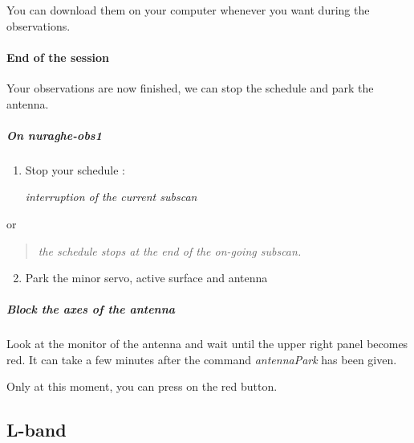\documentclass[letterpaper,10pt,english]{sphinxmanual}
\begin{document}
You can download them on your computer whenever you want during the observations.
\begin{quote}

\end{quote}


\paragraph{End of the session}
\label{SpectralLine/K-band/Xarcos/stop-session:end-of-the-session}\label{SpectralLine/K-band/Xarcos/stop-session::doc}
Your observations are now finished, we can stop the schedule and park
the antenna.


\subparagraph{On nuraghe-obs1}
\label{SpectralLine/K-band/Xarcos/stop-session:on-nuraghe-obs1}\begin{enumerate}
\item {} 
Stop your schedule :

   \emph{interruption of the current subscan}

\end{enumerate}

or
\begin{quote}

    \emph{the schedule stops at the end of the on-going subscan.}
\end{quote}
\begin{enumerate}
\setcounter{enumi}{1}
\item {} 
Park the minor servo, active surface and antenna





\end{enumerate}


\subparagraph{Block the axes of the antenna}
\label{SpectralLine/K-band/Xarcos/stop-session:block-the-axes-of-the-antenna}
Look at the monitor of the antenna and wait until the upper right
panel becomes red. It can take a few minutes after the command
\emph{antennaPark} has been given.

Only at this moment, you can press on the red button.


\subsection{L-band}
\label{SpectralLine/L-band/index:l-band}\label{SpectralLine/L-band/index::doc}
\end{document}
